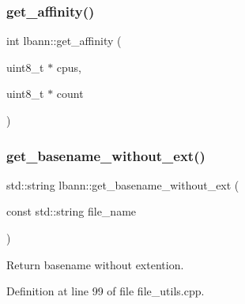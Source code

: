 \subsubsection{\texorpdfstring{get\+\_\+affinity()}{get\_affinity()}}
{\footnotesize\ttfamily int lbann\+::get\+\_\+affinity (\begin{DoxyParamCaption}\item[{uint8\+\_\+t $\ast$}]{cpus,  }\item[{uint8\+\_\+t $\ast$}]{count }\end{DoxyParamCaption})}

\mbox{\label{namespacelbann_aea9a4378326fd51236a8343c43cc4a7c}} 
\subsubsection{\texorpdfstring{get\+\_\+basename\+\_\+without\+\_\+ext()}{get\_basename\_without\_ext()}}
{\footnotesize\ttfamily std\+::string lbann\+::get\+\_\+basename\+\_\+without\+\_\+ext (\begin{DoxyParamCaption}\item[{const std\+::string}]{file\+\_\+name }\end{DoxyParamCaption})}



Return basename without extention. 



Definition at line 99 of file file\+\_\+utils.\+cpp.


